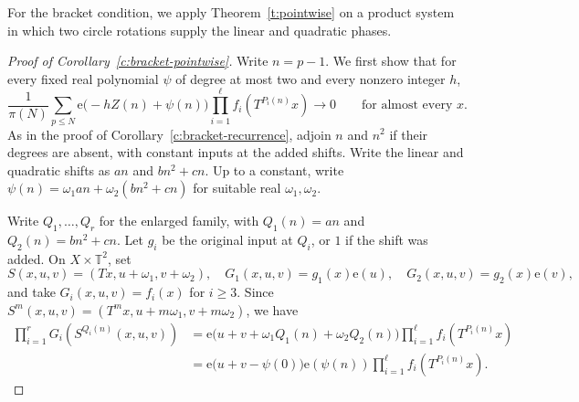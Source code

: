 \documentclass[12pt]{amsart}
\newcommand{\1}{\mathbf 1}
\newcommand{\e}{\mathrm e}
\theoremstyle{definition}
\begin{document}
For the bracket condition, we apply Theorem~\ref{t:pointwise}
on a product system in which two circle rotations supply the
linear and quadratic phases.

\begin{proof}[Proof of Corollary~\ref{c:bracket-pointwise}]
Write $n=p-1$. We first show that for every fixed real polynomial
$\psi$ of degree at most two and every nonzero integer $h$,
\begin{equation}\label{e:quadratic-twist}
 \frac1{\pi(N)}\sum_{p\leq N}
 \e\bigl(-hZ(n)+\psi(n)\bigr)
 \prod_{i=1}^{\ell}f_i(T^{P_i(n)}x)
 \longrightarrow 0
 \qquad\text{for almost every }x.
\end{equation}
As in the proof of Corollary~\ref{c:bracket-recurrence}, adjoin
$n$ and $n^2$ if their degrees are absent, with constant inputs
at the added shifts. Write the linear and quadratic shifts as
$an$ and $bn^2+cn$. Up to a constant, write 
$\psi(n)=\omega_1 an+\omega_2(bn^2+cn)$ for suitable real
$\omega_1,\omega_2$.

Write $Q_1,\ldots,Q_r$ for the enlarged family, with $Q_1(n)=an$
and $Q_2(n)=bn^2+cn$. Let $g_i$ be the original input at $Q_i$,
or $1$ if the shift was added. On $X\times\mathbb T^2$, set
\[
 S(x,u,v)=(Tx,u+\omega_1,v+\omega_2),\quad
 G_1(x,u,v)=g_1(x)\e(u),\quad
 G_2(x,u,v)=g_2(x)\e(v),
\]
and take $G_i(x,u,v)=f_i(x)$ for $i\geq3$. Since
$S^m(x,u,v)=(T^m x,u+m\omega_1,v+m\omega_2)$, we have
\begin{align}\label{e:prodidentity}
 \prod_{i=1}^{r}G_i(S^{Q_i(n)}(x,u,v))
 &=\e\bigl(u+v+\omega_1Q_1(n)+\omega_2Q_2(n)\bigr)
   \prod_{i=1}^{\ell}f_i(T^{P_i(n)}x)\\
 &=\e\bigl(u+v-\psi(0)\bigr)\e(\psi(n))
   \prod_{i=1}^{\ell}f_i(T^{P_i(n)}x)\nonumber.
\end{align}


\end{proof}
\end{document}
